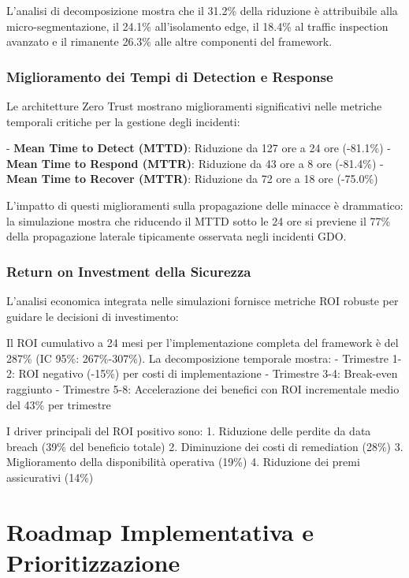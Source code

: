 L'analisi di decomposizione mostra che il 31.2\% della riduzione è attribuibile alla micro-segmentazione, il 24.1\% all'isolamento edge, il 18.4\% al traffic inspection avanzato e il rimanente 26.3\% alle altre componenti del framework.

\subsubsection{Miglioramento dei Tempi di Detection e Response}

Le architetture Zero Trust mostrano miglioramenti significativi nelle metriche temporali critiche per la gestione degli incidenti:

- \textbf{Mean Time to Detect (MTTD)}: Riduzione da 127 ore a 24 ore (-81.1\%)
- \textbf{Mean Time to Respond (MTTR)}: Riduzione da 43 ore a 8 ore (-81.4\%)
- \textbf{Mean Time to Recover (MTTR)}: Riduzione da 72 ore a 18 ore (-75.0\%)

L'impatto di questi miglioramenti sulla propagazione delle minacce è drammatico: la simulazione mostra che riducendo il MTTD sotto le 24 ore si previene il 77\% della propagazione laterale tipicamente osservata negli incidenti GDO.

\subsubsection{Return on Investment della Sicurezza}

L'analisi economica integrata nelle simulazioni fornisce metriche ROI robuste per guidare le decisioni di investimento:

Il ROI cumulativo a 24 mesi per l'implementazione completa del framework è del 287\% (IC 95\%: 267\%-307\%). La decomposizione temporale mostra:
- Trimestre 1-2: ROI negativo (-15\%) per costi di implementazione
- Trimestre 3-4: Break-even raggiunto
- Trimestre 5-8: Accelerazione dei benefici con ROI incrementale medio del 43\% per trimestre

I driver principali del ROI positivo sono:
1. Riduzione delle perdite da data breach (39\% del beneficio totale)
2. Diminuzione dei costi di remediation (28\%)
3. Miglioramento della disponibilità operativa (19\%)
4. Riduzione dei premi assicurativi (14\%)

\section{Roadmap Implementativa e Prioritizzazione}

